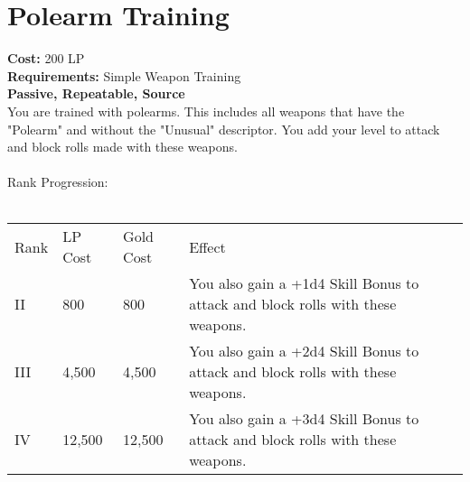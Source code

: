 \section{Polearm Training}\label{perk:polearmTraining}
\textbf{Cost:} 200 LP\\
\textbf{Requirements:} Simple Weapon Training\\
\textbf{Passive, Repeatable, Source}\\
You are trained with polearms.
This includes all weapons that have the "Polearm" and without the "Unusual" descriptor.
You add your level to attack and block rolls made with these weapons.\\
\\
Rank Progression:\\
\\
\begin{longtable}{l | l | l | p{9cm}}
	Rank & LP Cost & Gold Cost & Effect\\
	II & 800 & 800 & You also gain a +1d4 Skill Bonus to attack and block rolls with these weapons.\\
	III & 4,500 & 4,500 & You also gain a +2d4 Skill Bonus to attack and block rolls with these weapons.\\
	IV & 12,500 & 12,500 & You also gain a +3d4 Skill Bonus to attack and block rolls with these weapons.\\
\end{longtable}